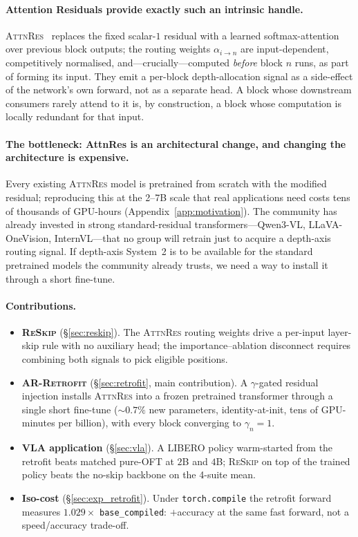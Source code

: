\documentclass{article}
\newcommand{\attnres}{\textsc{AttnRes}}
\newcommand{\reskip}{\textsc{ReSkip}}
\newcommand{\retrofit}{\textsc{AR-Retrofit}}
\begin{document}
\paragraph{Attention Residuals provide exactly such an intrinsic handle.}
\attnres{}~\citep{chen2026attnres} replaces the fixed scalar-$1$ residual with a learned softmax-attention over previous block outputs; the routing weights $\alpha_{i\to n}$ are input-dependent, competitively normalised, and---crucially---computed \emph{before} block $n$ runs, as part of forming its input. They emit a per-block depth-allocation signal as a side-effect of the network's own forward, not as a separate head. A block whose downstream consumers rarely attend to it is, by construction, a block whose computation is locally redundant for that input.

\paragraph{The bottleneck: AttnRes is an architectural change, and changing the architecture is expensive.}
Every existing \attnres{} model is pretrained from scratch with the modified residual; reproducing this at the 2--7B scale that real applications need costs tens of thousands of GPU-hours (Appendix~\ref{app:motivation}). The community has already invested in strong standard-residual transformers---Qwen3-VL, LLaVA-OneVision, InternVL---that no group will retrain just to acquire a depth-axis routing signal. If depth-axis System~2 is to be available for the standard pretrained models the community already trusts, we need a way to install it through a short fine-tune.

\paragraph{Contributions.}
\begin{itemize}
\item \textbf{\reskip{}} (\S\ref{sec:reskip}). The \attnres{} routing weights drive a per-input layer-skip rule with no auxiliary head; the importance--ablation disconnect requires combining both signals to pick eligible positions.
\item \textbf{\retrofit{}} (\S\ref{sec:retrofit}, main contribution). A $\gamma$-gated residual injection installs \attnres{} into a frozen pretrained transformer through a single short fine-tune ($\sim$$0.7\%$ new parameters, identity-at-init, tens of GPU-minutes per billion), with every block converging to $\gamma_n{=}1$.
\item \textbf{VLA application} (\S\ref{sec:vla}). A LIBERO policy warm-started from the retrofit beats matched pure-OFT at $2$B and $4$B; \reskip{} on top of the trained policy beats the no-skip backbone on the 4-suite mean.
\item \textbf{Iso-cost} (\S\ref{sec:exp_retrofit}). Under \texttt{torch.compile} the retrofit forward measures $1.029\times$ \texttt{base\_compiled}: $+$accuracy at the same fast forward, not a speed/accuracy trade-off.
\end{itemize}
\end{document}
